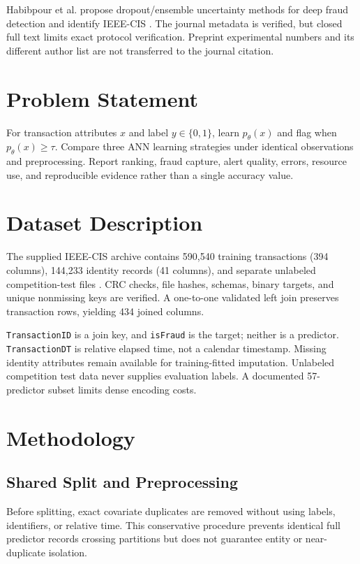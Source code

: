 \documentclass[11pt,a4paper]{article}
\begin{document}
Habibpour et al. propose dropout/ensemble uncertainty methods for deep fraud detection and identify IEEE-CIS \cite{habibpour2023uncertainty}. The journal metadata is verified, but closed full text limits exact protocol verification. Preprint experimental numbers and its different author list are not transferred to the journal citation.

\section{Problem Statement}
For transaction attributes $x$ and label $y\in\{0,1\}$, learn $p_\theta(x)$ and flag when $p_\theta(x)\geq\tau$. Compare three ANN learning strategies under identical observations and preprocessing. Report ranking, fraud capture, alert quality, errors, resource use, and reproducible evidence rather than a single accuracy value.

\section{Dataset Description}
The supplied IEEE-CIS archive contains 590,540 training transactions (394 columns), 144,233 identity records (41 columns), and separate unlabeled competition-test files \cite{kaggleieee}. CRC checks, file hashes, schemas, binary targets, and unique nonmissing keys are verified. A one-to-one validated left join preserves transaction rows, yielding 434 joined columns.

\texttt{TransactionID} is a join key, and \texttt{isFraud} is the target; neither is a predictor. \texttt{TransactionDT} is relative elapsed time, not a calendar timestamp. Missing identity attributes remain available for training-fitted imputation. Unlabeled competition test data never supplies evaluation labels. A documented 57-predictor subset limits dense encoding costs.

\section{Methodology}
\subsection{Shared Split and Preprocessing}
Before splitting, exact covariate duplicates are removed without using labels, identifiers, or relative time. This conservative procedure prevents identical full predictor records crossing partitions but does not guarantee entity or near-duplicate isolation.
\end{document}
